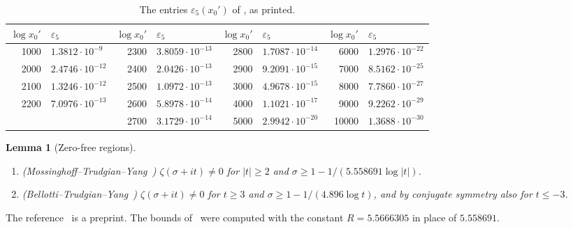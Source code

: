\documentclass{amsart}
\newtheorem{lemma}[theorem]{Lemma}
\theoremstyle{definition}
\theoremstyle{remark}
\theoremstyle{plain}
\numberwithin{equation}{section}
\newcommand{\eps}{\varepsilon}
\begin{document}
\begin{table}[ht]
\caption{The entries $\eps_5(x_0')$ of \cite[Table~5]{FKS23}, as printed.}\label{tab:FKS5}
\small
\begin{tabular}{rl@{\qquad}rl@{\qquad}rl@{\qquad}rl}
\toprule
$\log x_0'$ & $\eps_5$ & $\log x_0'$ & $\eps_5$ & $\log x_0'$ & $\eps_5$ & $\log x_0'$ & $\eps_5$\\
\midrule
1000 & $1.3812\cdot10^{-9}$  & 2300 & $3.8059\cdot10^{-13}$ & 2800 & $1.7087\cdot10^{-14}$ & 6000 & $1.2976\cdot10^{-22}$\\
2000 & $2.4746\cdot10^{-12}$ & 2400 & $2.0426\cdot10^{-13}$ & 2900 & $9.2091\cdot10^{-15}$ & 7000 & $8.5162\cdot10^{-25}$\\
2100 & $1.3246\cdot10^{-12}$ & 2500 & $1.0972\cdot10^{-13}$ & 3000 & $4.9678\cdot10^{-15}$ & 8000 & $7.7860\cdot10^{-27}$\\
2200 & $7.0976\cdot10^{-13}$ & 2600 & $5.8978\cdot10^{-14}$ & 4000 & $1.1021\cdot10^{-17}$ & 9000 & $9.2262\cdot10^{-29}$\\
     &                       & 2700 & $3.1729\cdot10^{-14}$ & 5000 & $2.9942\cdot10^{-20}$ & 10000 & $1.3688\cdot10^{-30}$\\
\bottomrule
\end{tabular}
\end{table}

\begin{lemma}[Zero-free regions]\label{lem:ZFR}
\begin{enumerate}
\item[(i)] \textup{(Mossinghoff--Trudgian--Yang~\cite{MTY23})} $\zeta(\sigma+it)\ne0$ for $|t|\ge2$ and $\sigma\ge1-1/(5.558691\log|t|)$.
\item[(ii)] \textup{(Bellotti--Trudgian--Yang~\cite{BTY26})} $\zeta(\sigma+it)\ne0$ for $t\ge3$ and $\sigma\ge1-1/(4.896\log t)$, and by conjugate symmetry also for $t\le-3$.
\end{enumerate}
\end{lemma}

The reference~\cite{BTY26} is a preprint. The bounds of~\cite{FKS23} were computed with the constant $R=5.5666305$ in place of $5.558691$.
\end{document}
